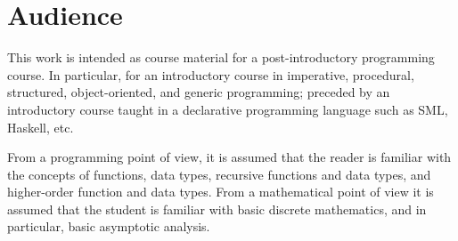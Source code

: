 \section{Audience}

This work is intended as course material for a post-introductory programming
course. In particular, for an introductory course in imperative, procedural,
structured, object-oriented, and generic programming; preceded by an
introductory course taught in a declarative programming language such as SML,
Haskell, etc.

From a programming point of view, it is assumed that the reader is familiar
with the concepts of functions, data types, recursive functions and data types,
and higher-order function and data types. From a mathematical point of view it
is assumed that the student is familiar with basic discrete mathematics, and in
particular, basic asymptotic analysis.

